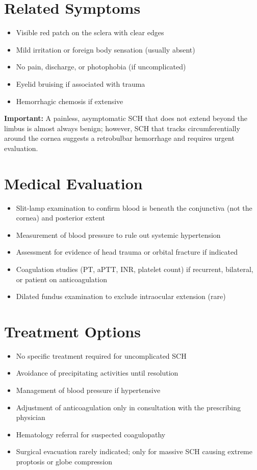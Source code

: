 \section*{Related Symptoms}
\begin{itemize}
  \item Visible red patch on the sclera with clear edges
  \item Mild irritation or foreign body sensation (usually absent)
  \item No pain, discharge, or photophobia (if uncomplicated)
  \item Eyelid bruising if associated with trauma
  \item Hemorrhagic chemosis if extensive
\end{itemize}
\textbf{Important:} A painless, asymptomatic SCH that does not extend beyond the limbus is almost always benign; however, SCH that tracks circumferentially around the cornea suggests a retrobulbar hemorrhage and requires urgent evaluation.

\section*{Medical Evaluation}
\begin{itemize}
  \item Slit-lamp examination to confirm blood is beneath the conjunctiva (not the cornea) and posterior extent
  \item Measurement of blood pressure to rule out systemic hypertension
  \item Assessment for evidence of head trauma or orbital fracture if indicated
  \item Coagulation studies (PT, aPTT, INR, platelet count) if recurrent, bilateral, or patient on anticoagulation
  \item Dilated fundus examination to exclude intraocular extension (rare)
\end{itemize}

\section*{Treatment Options}
\begin{itemize}
  \item No specific treatment required for uncomplicated SCH
  \item Avoidance of precipitating activities until resolution
  \item Management of blood pressure if hypertensive
  \item Adjustment of anticoagulation only in consultation with the prescribing physician
  \item Hematology referral for suspected coagulopathy
  \item Surgical evacuation rarely indicated; only for massive SCH causing extreme proptosis or globe compression
\end{itemize}

